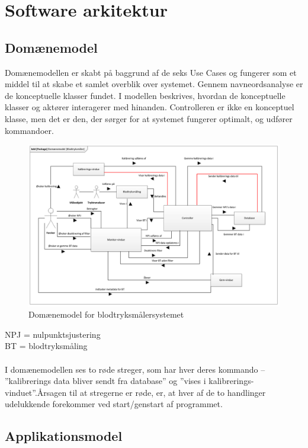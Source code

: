 \section{Software arkitektur}

\subsection{Domænemodel}
Domænemodellen er skabt på baggrund af de seks Use Cases og fungerer som et middel til at skabe et samlet overblik over systemet. Gennem navneordsanalyse er de konceptuelle klasser fundet. I modellen beskrives, hvordan de konceptuelle klasser og aktører interagerer med hinanden. Controlleren er ikke en konceptuel klasse, men det er den, der sørger for at systemet fungerer optimalt, og udfører kommandoer.

\begin{figure}[H]
	\centering
	\includegraphics[width=1 \textwidth]{Figurer/Snip20151104_30}
	\caption{Domænemodel for blodtryksmålersystemet}
\end{figure}

NPJ = nulpunktsjustering\\
BT = blodtryksmåling
\\ \\
I domænemodellen ses to røde streger, som har hver deres kommando – ”kalibrerings data bliver sendt fra database” og ”vises i kalibrerings-vinduet”.Årsagen til at stregerne er røde, er, at hver af de to handlinger udelukkende forekommer ved start/genstart af programmet.

\subsection{Applikationsmodel}

